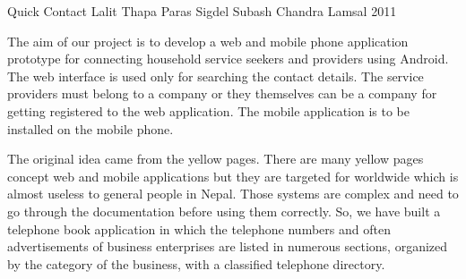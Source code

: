  \begin{conf-abstract}[]
 {Quick Contact}
 {Lalit Thapa
Paras Sigdel
Subash Chandra Lamsal
 }
{2011}

The aim of our project is to develop a web and mobile phone application prototype for connecting household service seekers and providers using Android. The web interface is used only for searching the contact details. The service providers must belong to a company or they themselves can be a company for getting registered to the web application. The mobile application is to be installed on the mobile phone.

The original idea came from the yellow pages. There are many yellow pages concept web and mobile applications but they are targeted for worldwide which is almost useless to general people in Nepal. Those systems are complex and need to go through the documentation before using them correctly. So, we have built a telephone book application in which the telephone numbers and often advertisements of business enterprises are listed in numerous sections, organized by the category of the business, with a  classified telephone directory.
 \end{conf-abstract}